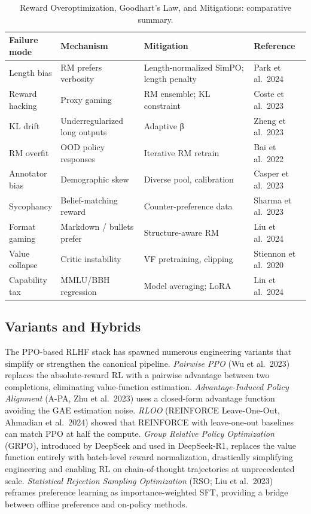 \documentclass{article}
\begin{document}
\begin{table}[t]
\centering
\caption{Reward Overoptimization, Goodhart's Law, and Mitigations: comparative summary.}
\label{tab:reward-overoptimization-goodhart-s-law-and-mitigations}
\begin{tabular}{>{\raggedright\arraybackslash}p{0.1373\linewidth}
  >{\raggedright\arraybackslash}p{0.2843\linewidth}
  >{\raggedright\arraybackslash}p{0.3824\linewidth}
  >{\raggedright\arraybackslash}p{0.1961\linewidth}}
\toprule
Failure mode & Mechanism & Mitigation & Reference \\
\midrule
Length bias & RM prefers verbosity & Length-normalized SimPO; length penalty & Park et al.~2024 \\
Reward hacking & Proxy gaming & RM ensemble; KL constraint & Coste et al.~2023 \\
KL drift & Underregularized long outputs & Adaptive β & Zheng et al.~2023 \\
RM overfit & OOD policy responses & Iterative RM retrain & Bai et al.~2022 \\
Annotator bias & Demographic skew & Diverse pool, calibration & Casper et al.~2023 \\
Sycophancy & Belief-matching reward & Counter-preference data & Sharma et al.~2023 \\
Format gaming & Markdown / bullets prefer & Structure-aware RM & Liu et al.~2024 \\
Value collapse & Critic instability & VF pretraining, clipping & Stiennon et al.~2020 \\
Capability tax & MMLU/BBH regression & Model averaging; LoRA & Lin et al.~2024 \\
\end{tabular}
\end{table}

\subsection{Variants and Hybrids}\label{variants-and-hybrids}

The PPO-based RLHF stack has spawned numerous engineering variants that simplify or strengthen the canonical pipeline. \emph{Pairwise PPO} (Wu et al.~2023) replaces the absolute-reward RL with a pairwise advantage between two completions, eliminating value-function estimation. \emph{Advantage-Induced Policy Alignment} (A-PA, Zhu et al.~2023) uses a closed-form advantage function avoiding the GAE estimation noise. \emph{RLOO} (REINFORCE Leave-One-Out, Ahmadian et al.~2024) showed that REINFORCE with leave-one-out baselines can match PPO at half the compute. \emph{Group Relative Policy Optimization} (GRPO), introduced by DeepSeek and used in DeepSeek-R1, replaces the value function entirely with batch-level reward normalization, drastically simplifying engineering and enabling RL on chain-of-thought trajectories at unprecedented scale. \emph{Statistical Rejection Sampling Optimization} (RSO; Liu et al.~2023) reframes preference learning as importance-weighted SFT, providing a bridge between offline preference and on-policy methods.
\end{document}
